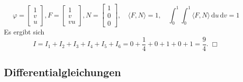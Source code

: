\documentclass[a4paper,10pt,fleqn,twoside]{scrartcl}
\numberwithin{equation}{section}
\theoremstyle{Aufgabe}
\begin{document}
\[
\varphi = \begin{bmatrix}1\\ v\\ u\end{bmatrix},
F = \begin{bmatrix}1\\ v\\ vu\end{bmatrix},
N = \begin{bmatrix}1\\ 0\\ 0\end{bmatrix},
\quad\langle F,N\rangle = 1,
\quad\int_0^1 \int_0^1 \langle F,N\rangle\,\mathrm du\,\mathrm dv = 1
\]
Es ergibt sich
\[I = I_1+I_2+I_3+I_4+I_5+I_6 = 0+\frac{1}{4}+0+1+0+1 = \frac{9}{4}.\;\Box\]

\newpage
\subsection{Differentialgleichungen}
\end{document}
